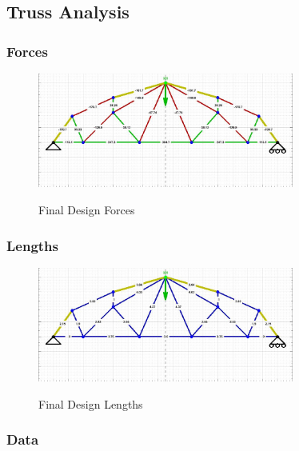 \documentclass{article}
\let\Oldsubsection\subsection
\renewcommand{\subsection}{\FloatBarrier\Oldsubsection}
\let\Oldsubsubsection\subsubsection
\renewcommand{\subsubsection}{\FloatBarrier\Oldsubsubsection}
\begin{document}
\newpage

\subsection{Truss Analysis}

\subsubsection{Forces}

\begin{figure}[!htb]
  \centering
  \includegraphics[width=0.75\textwidth]{assets/final_truss_1_forces.jpg}
  \label{fig:truss-forces-main}
  \caption{Final Design Forces}
\end{figure}

\subsubsection{Lengths}

\begin{figure}[!htb]
  \centering
  \includegraphics[width=0.75\textwidth]{assets/final_truss_1_lengths.jpg}
  \label{fig:truss-lengths-main}
  \caption{Final Design Lengths}
\end{figure}

\subsubsection{Data}

\centering
{}

\newpage
\end{document}
